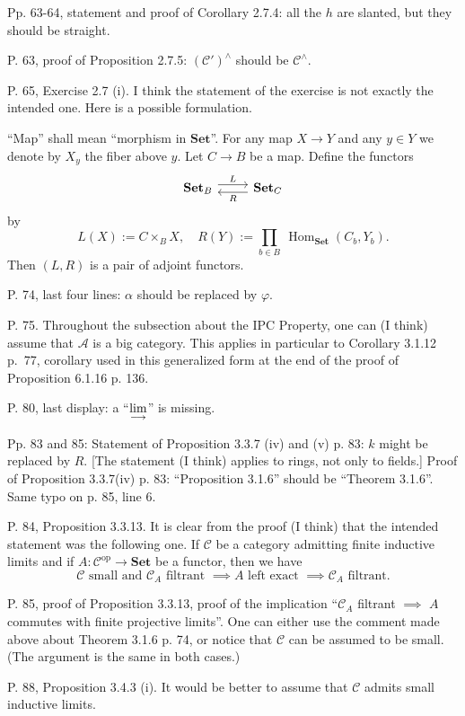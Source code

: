 \documentclass[12pt]{article}
\theoremstyle{remark}
\newcommand{\n}{\noindent}
\newcommand{\A}{\mathcal A}
\newcommand{\C}{\mathcal C}
\newcommand{\Set}{\textbf{Set}}
\newcommand{\op}{\text{op}}
\newcommand{\colim}{\operatornamewithlimits{\underset{\longrightarrow}{lim}}}
\DeclareMathOperator{\Hom}{Hom}
\begin{document}
\n Pp. 63-64, statement and proof of Corollary 2.7.4: all the $h$ are slanted, but they should be straight.

\n P. 63, proof of Proposition 2.7.5: $(\C')^\wedge$ should be $\C^\wedge$. 

\n P. 65, Exercise 2.7 (i). I think the statement of the exercise is not exactly the intended one. Here is a possible formulation. 

``Map'' shall mean ``morphism in $\Set$''. For any map $X\to Y$ and any $y\in Y$ we denote by $X_y$ the fiber above $y$. Let $C\to B$ be a map. Define the functors 
$$
\begin{tikzcd}
\Set_B\ar[yshift=.7ex]{r}{L}&\Set_C\ar[yshift=-.7ex]{l}{R}
\end{tikzcd}
$$
by
$$
L(X):=C\times_BX,\quad R(Y):=\prod_{b\in B}\ \Hom_\Set(C_b,Y_b). 
$$ 
Then $(L,R)$ is a pair of adjoint functors. 

\n P. 74, last four lines: $\alpha$ should be replaced by $\varphi$. 

\n P. 75. Throughout the subsection about the IPC Property, one can (I think) assume that $\A$ is a big category. This applies in particular to Corollary 3.1.12 p.~77, corollary used in this generalized form at the end of the proof of Proposition 6.1.16 p. 136.

\n P. 80, last display: a ``$\displaystyle\colim$'' is missing.

\n Pp. 83 and 85: Statement of Proposition 3.3.7 (iv) and (v) p. 83: $k$ might be replaced by $R$. [The statement (I think) applies to rings, not only to fields.] Proof of Proposition 3.3.7(iv) p. 83: ``Proposition 3.1.6'' should be ``Theorem 3.1.6''. Same typo on p. 85, line 6. 

\n P. 84, Proposition 3.3.13. It is clear from the proof (I think) that the intended statement was the following one. If $\C$ be a category admitting finite inductive limits and if $A:\C^\op\to\Set$ be a functor, then we have 
$$
\C\text{ small and }\C_A\text{ filtrant }\implies A\text{ left exact }\implies\C_A\text{ filtrant}.
$$

\n P. 85, proof of Proposition 3.3.13, proof of the implication ``$\C_A$ filtrant $\implies$ $A$ commutes with finite projective limits''. One can either use the comment made above about Theorem 3.1.6 p. 74, or notice that $\C$ can be assumed to be small. (The argument is the same in both cases.) 

\n P. 88, Proposition 3.4.3 (i). It would be better to assume that $\C$ admits small inductive limits. 
\end{document}
